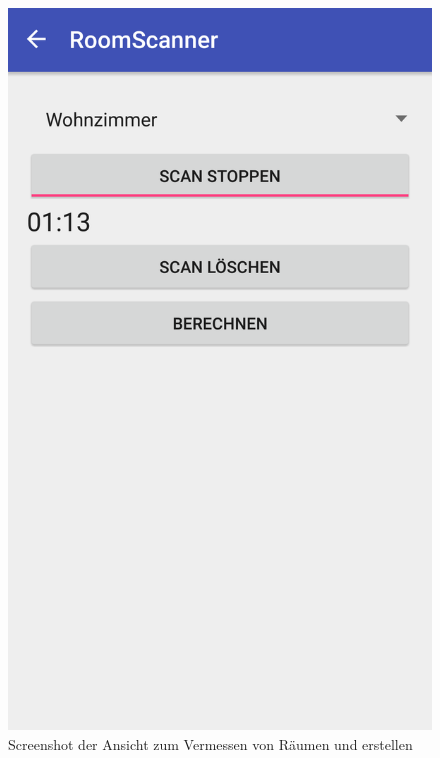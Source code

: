 \begin{figure}[H]
\centering
\includegraphics[width=0.4\linewidth]{../Bilder/ScreenshotPhoneRoomScanner}
\caption{Screenshot der Ansicht zum Vermessen von Räumen und erstellen}
\label{fig:ScreenshotPhoneRoomScanner}
\end{figure}




